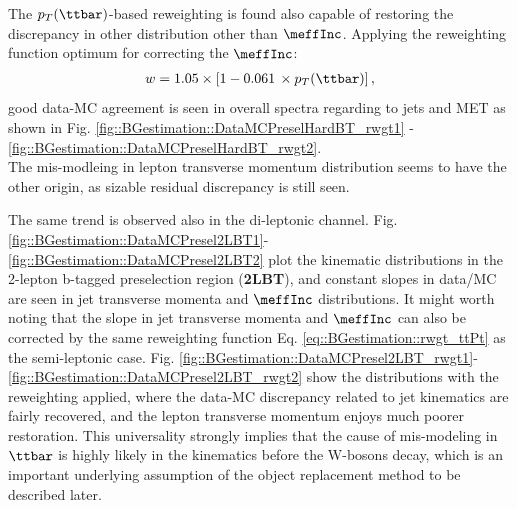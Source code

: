 \clearpage
The $p_T(\ttbar)$-based reweighting is found also capable of restoring the discrepancy in other distribution other than $\meffInc$. Applying the reweighting function optimum for correcting the $\meffInc$:
\begin{align}
w = 1.05 \times \left[ 1 - 0.061 \,\times p_T(\ttbar) \right] \label{eq::BGestimation::rwgt_ttPt},
\end{align}
good data-MC agreement is seen in overall spectra regarding to jets and MET as shown in Fig. \ref{fig::BGestimation::DataMCPreselHardBT_rwgt1} - \ref{fig::BGestimation::DataMCPreselHardBT_rwgt2}. \\

The mis-modleing in lepton transverse momentum distribution seems to have the other origin, as sizable residual discrepancy is still seen. 


\clearpage


%
\clearpage

\clearpage
The same trend is observed also in the di-leptonic channel. Fig. \ref{fig::BGestimation::DataMCPresel2LBT1}-\ref{fig::BGestimation::DataMCPresel2LBT2} plot the kinematic distributions in the 2-lepton b-tagged preselection region (\textbf{2LBT}), and constant slopes in data/MC are seen in jet transverse momenta and $\meffInc$ distributions.
It might worth noting that the slope in jet transverse momenta and $\meffInc$ can also be corrected by the same reweighting function Eq. \ref{eq::BGestimation::rwgt_ttPt} as the semi-leptonic case. Fig. \ref{fig::BGestimation::DataMCPresel2LBT_rwgt1}-\ref{fig::BGestimation::DataMCPresel2LBT_rwgt2} show the distributions with the reweighting applied, where the data-MC discrepancy related to jet kinematics are fairly recovered, and the lepton transverse momentum enjoys much poorer restoration. 
This universality strongly implies that the cause of mis-modeling in $\ttbar$ is highly likely in the kinematics before the W-bosons decay, which is an important underlying assumption of the object replacement method to be described later. \\



